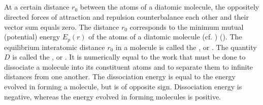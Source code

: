 \subsection{}\label{39.4.3} At a certain distance $r_{0}$ between the atoms of a diatomic molecule, the oppositely directed forces of attraction and repulsion counterbalance
each other and their vector sum equals zero. The distance $r_{0}$ corresponds to the minimum mutual (potential) energy $E_{p} (r)$ of the atoms of a diatomic molecule (cf. ) (). The equilibrium interatomic distance $r_{0}$ in a molecule is called the , or . The quantity $D$ is called the , or . It is numerically equal to the work that must be done to dissociate a molecule into its constituent atoms and to separate them to infinite distances from one another. The dissociation energy is equal to the energy evolved in forming a molecule, but is of opposite sign. Dissociation energy is negative, whereas the energy evolved in forming molecules is positive.

